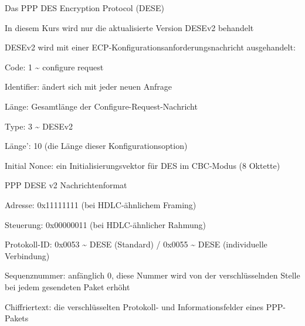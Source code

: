 \documentclass[a4paper]{article}
\begin{document}
\begin{multicols}{3}
\begin{itemize*}
\begin{itemize*}
\begin{itemize*}
\begin{itemize*}
                        \end{itemize*}
                  \end{itemize*}
            \end{itemize*}
            \item Das PPP DES Encryption Protocol (DESE)
            \begin{itemize*}
                  \item In diesem Kurs wird nur die aktualisierte Version DESEv2 behandelt
                  \item DESEv2 wird mit einer ECP-Konfigurationsanforderungsnachricht ausgehandelt:
                  \begin{itemize*}
                        \item Code: 1 \textasciitilde{} configure request
                        \item Identifier: ändert sich mit jeder neuen Anfrage
                        \item Länge: Gesamtlänge der Configure-Request-Nachricht
                        \item Type: 3 \textasciitilde{} DESEv2
                        \item Länge': 10 (die Länge dieser Konfigurationsoption)
                        \item Initial Nonce: ein Initialisierungsvektor für DES im CBC-Modus (8 Oktette)
                  \end{itemize*}
            \end{itemize*}
            \item PPP DESE v2 Nachrichtenformat
            \begin{itemize*}
                  \item Adresse: 0x11111111 (bei HDLC-ähnlichem Framing)
                  \item Steuerung: 0x00000011 (bei HDLC-ähnlicher Rahmung)
                  \item Protokoll-ID: 0x0053 \textasciitilde{} DESE (Standard) / 0x0055 \textasciitilde{} DESE (individuelle Verbindung)
                  \item Sequenznummer: anfänglich 0, diese Nummer wird von der verschlüsselnden Stelle bei jedem gesendeten Paket erhöht
                  \item Chiffriertext: die verschlüsselten Protokoll- und Informationsfelder eines PPP-Pakets

\end{itemize*}
\end{itemize*}
\end{multicols}
\end{document}
